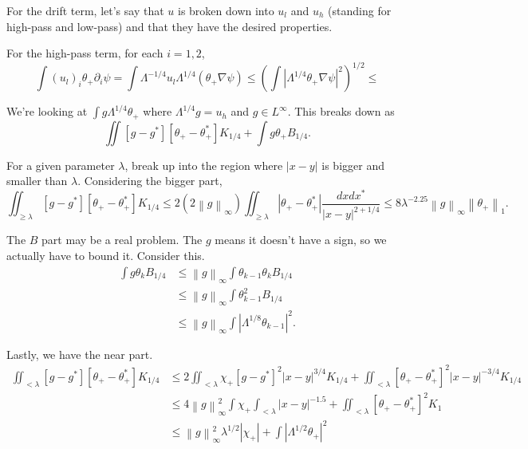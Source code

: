 \documentclass[11pt]{amsart}
\theoremstyle{remark}
\newcommand{\eps}{\varepsilon}
\newcommand{\norm}[1]{\left\lVert#1\right\rVert}
\newcommand{\paren}[1]{\left( #1 \right)}
\newcommand{\abs}[1]{\left\lvert #1 \right\rvert}
\newcommand{\del}{\partial}
\newcommand{\grad}{\nabla}
\newcommand{\indic}[1]{\chi_{\{#1\}}}
\begin{document}

For the drift term, let's say that $u$ is broken down into $u_l$ and $u_h$ (standing for high-pass and low-pass) and that they have the desired properties.  

For the high-pass term, for each $i = 1,2$,
\[ \int (u_l)_i \theta_+ \del_i \psi = \int \Lambda^{-1/4} u_l \Lambda^{1/4} (\theta_+ \grad \psi) \leq \paren{\int \abs{\Lambda^{1/4} \theta_+ \grad \psi}^2}^{1/2} \leq \]

We're looking at $\int g \Lambda^{1/4} \theta_+$ where $\Lambda^{1/4} g = u_h$ and $g \in L^\infty$.  This breaks down as
\[ \iint [g-g^*][\theta_+-\theta_+^*] K_{1/4} + \int g \theta_+ B_{1/4}. \]

For a given parameter $\lambda$, break up into the region where $|x-y|$ is bigger and smaller than $\lambda$.  Considering the bigger part,
\[ \iint_{\geq \lambda} [g-g^*][\theta_+ - \theta_+^*] K_{1/4} \leq 2 (2 \norm{g}_\infty) \iint_{\geq \lambda} |\theta_+ - \theta_+^*| \frac{dxdx^*}{|x-y|^{2+1/4}} \leq 8 \lambda^{-2.25} \norm{g}_\infty \norm{\theta_+}_1. \]

The $B$ part may be a real problem.  The $g$ means it doesn't have a sign, so we actually have to bound it.  Consider this.  
\begin{align*}
\int g \theta_k B_{1/4} &\leq \norm{g}_\infty \int \theta_{k-1} \theta_k B_{1/4}
\\ &\leq \norm{g}_\infty \int \theta_{k-1}^2 B_{1/4}
\\ &\leq \norm{g}_\infty \int \abs{\Lambda^{1/8} \theta_{k-1}}^2.
\end{align*} 

Lastly, we have the near part.  
\begin{align*} 
\iint_{< \lambda} [g-g^*][\theta_+ - \theta_+^*] K_{1/4} &\leq 2\iint_{<\lambda} \chi_+ [g-g^*]^2 |x-y|^{3/4} K_{1/4} + \iint_{<\lambda} [\theta_+-\theta_+^*]^2 |x-y|^{-3/4} K_{1/4} 
\\ &\leq 4 \norm{g}_\infty^2 \int \chi_+ \int_{<\lambda} |x-y|^{-1.5} + \iint_{<\lambda} [\theta_+-\theta_+^*]^2 K_1
\\ &\leq \norm{g}_\infty^2 \lambda^{1/2} \abs{\chi_+} + \int \abs{\Lambda^{1/2} \theta_+}^2
\end{align*}
\end{document}
